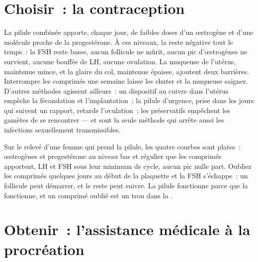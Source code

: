 \section{Choisir~: la contraception}

\begin{proposition}\label{prop:g11:hormones-and-reproduction:contraception}
La pilule combinée apporte, chaque jour, de faibles doses d'un
œstrogène et d'une molécule proche de la progestérone. À ces niveaux,
la  reste négative tout le temps~: la FSH reste basse, aucun
follicule ne mûrit, aucun pic d'œstrogènes ne survient, aucune bouffée
de LH, aucune ovulation. La muqueuse de l'utérus, maintenue mince, et
la glaire du col, maintenue épaisse, ajoutent deux barrières.
Interrompre les comprimés une semaine laisse les  chuter et la
muqueuse saigner. D'autres méthodes agissent ailleurs~: un dispositif
au cuivre dans l'utérus empêche la fécondation et l'implantation~; la
pilule d'urgence, prise dans les jours qui suivent un rapport, retarde
l'ovulation~; les préservatifs empêchent les gamètes de se rencontrer
--- et sont la seule méthode qui arrête aussi les infections
sexuellement transmissibles.
\end{proposition}
\admitted

\begin{example}\label{ex:g11:hormones-and-reproduction:pill}
Sur le relevé d'une femme qui prend la pilule, les quatre courbes sont
plates~: œstrogènes et progestérone au niveau bas et régulier que les
comprimés apportent, LH et FSH sous leur minimum de cycle, aucun pic
nulle part. Oubliez les comprimés quelques jours au début de la
plaquette et la FSH s'échappe~: un follicule peut démarrer, et le reste
peut suivre. La pilule fonctionne parce que la  fonctionne,
et un comprimé oublié est un trou dans la .
\end{example}

\section{Obtenir~: l'assistance médicale à la procréation}

